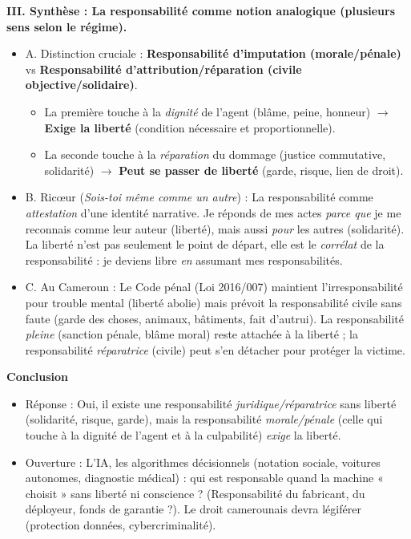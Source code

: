 \documentclass[11pt]{article}
\begin{document}
\begin{exoresolu}
\textbf{III. Synthèse : La responsabilité comme notion analogique (plusieurs sens selon le régime).}
\begin{itemize}
    \item A. Distinction cruciale : \textbf{Responsabilité d'imputation (morale/pénale)} vs \textbf{Responsabilité d'attribution/réparation (civile objective/solidaire)}.
        \begin{itemize}
            \item La première touche à la \emph{dignité} de l'agent (blâme, peine, honneur) $\rightarrow$ \textbf{Exige la liberté} (condition nécessaire et proportionnelle).
            \item La seconde touche à la \emph{réparation} du dommage (justice commutative, solidarité) $\rightarrow$ \textbf{Peut se passer de liberté} (garde, risque, lien de droit).
        \end{itemize}
    \item B. Ricœur (\emph{Sois-toi même comme un autre}) : La responsabilité comme \emph{attestation} d'une identité narrative. Je réponds de mes actes \emph{parce que} je me reconnais comme leur auteur (liberté), mais aussi \emph{pour} les autres (solidarité). La liberté n'est pas seulement le point de départ, elle est le \emph{corrélat} de la responsabilité : je deviens libre \emph{en} assumant mes responsabilités.
    \item C. Au Cameroun : Le Code pénal (Loi 2016/007) maintient l'irresponsabilité pour trouble mental (liberté abolie) mais prévoit la responsabilité civile sans faute (garde des choses, animaux, bâtiments, fait d'autrui). La responsabilité \emph{pleine} (sanction pénale, blâme moral) reste attachée à la liberté ; la responsabilité \emph{réparatrice} (civile) peut s'en détacher pour protéger la victime.
\end{itemize}

\textbf{Conclusion}
\begin{itemize}
    \item Réponse : \og Oui, il existe une responsabilité \emph{juridique/réparatrice} sans liberté (solidarité, risque, garde), mais la responsabilité \emph{morale/pénale} (celle qui touche à la dignité de l'agent et à la culpabilité) \emph{exige} la liberté. \fg{}
    \item Ouverture : L'IA, les algorithmes décisionnels (notation sociale, voitures autonomes, diagnostic médical) : qui est responsable quand la machine « choisit » sans liberté ni conscience ? (Responsabilité du fabricant, du déployeur, fonds de garantie ?). Le droit camerounais devra légiférer (protection données, cybercriminalité).
\end{itemize}
\end{exoresolu}
\end{document}
